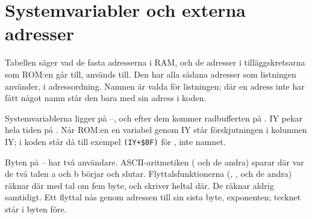 
\chapter{Systemvariabler och externa adresser}\label{kap:variabler}
\begingroup\setlength{\parskip}{5pt plus 1pt}
\par\noindent Tabellen säger vad de fasta adresserna i RAM, och de adresser i tilläggskretsarna som ROM:en går till, används till. Den har alla sådana adresser som listningen använder, i adressordning. Namnen är valda för listningen; där en adress inte har fått något namn står den bara med sin adress i koden.\par
\par\noindent Systemvariablerna ligger på –, och efter dem kommer radbufferten på . IY pekar hela tiden på . Når ROM:en en variabel genom IY står förskjutningen i kolumnen IY; i koden står då till exempel \texttt{(IY+\$0F)} för , inte namnet.\par
\par\noindent Byten på – har två användare. ASCII-aritmetiken ( och de andra) sparar där var de två talen a och b börjar och slutar. Flyttalsfunktionerna (, ,  och de andra) räknar där med tal om fem byte, och  skriver heltal där. De räknar aldrig samtidigt. Ett flyttal nås genom adressen till sin sista byte, exponenten; tecknet står i byten före.\par
{}
